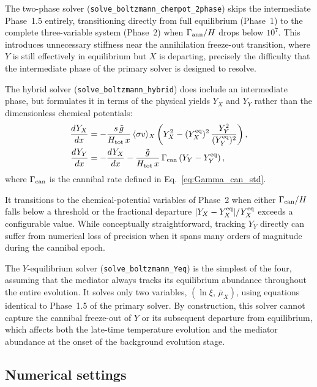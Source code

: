\documentclass[11pt]{article}
\numberwithin{equation}{section}
\newcommand{\sigmav}{\langle\sigma v\rangle}
\begin{document}
The two-phase solver (\texttt{solve\_boltzmann\_chempot\_2phase}) skips the intermediate Phase~1.5 entirely, transitioning directly from full equilibrium (Phase~1) to the complete three-variable system (Phase~2) when $\Gamma_{\rm ann}/H$ drops below $10^7$. This introduces unnecessary stiffness near the annihilation freeze-out transition, where $Y$ is still effectively in equilibrium but $X$ is departing, precisely the difficulty that the intermediate phase of the primary solver is designed to resolve.

The hybrid solver (\texttt{solve\_boltzmann\_hybrid}) does include an intermediate phase, but formulates it in terms of the physical yields $Y_X$ and $Y_Y$ rather than the dimensionless chemical potentials:
\begin{align}
\frac{dY_X}{dx} &= -\frac{s\,\tilde g}{H_{\rm tot}\,x}\,\sigmav_X\left(Y_X^2 - (Y_X^{\rm eq})^2\,\frac{Y_Y^2}{(Y_Y^{\rm eq})^2}\right), \label{eq:dYX_hybrid} \\
\frac{dY_Y}{dx} &= -\frac{dY_X}{dx} - \frac{\tilde g}{H_{\rm tot}\,x}\,\Gamma_{\rm can}\,(Y_Y - Y_Y^{\rm eq})\,,
\label{eq:dYY_hybrid}
\end{align}
where $\Gamma_{\rm can}$ is the cannibal rate defined in Eq.~\eqref{eq:Gamma_can_std}.

It transitions to the chemical-potential variables of Phase~2 when either $\Gamma_{\rm can}/H$ falls below a threshold or the fractional departure $|Y_X - Y_X^{\rm eq}|/Y_X^{\rm eq}$ exceeds a configurable value. While conceptually straightforward, tracking $Y_Y$ directly can suffer from numerical loss of precision when it spans many orders of magnitude during the cannibal epoch.

The $Y$-equilibrium solver (\texttt{solve\_boltzmann\_Yeq}) is the simplest of the four, assuming that the mediator always tracks its equilibrium abundance throughout the entire evolution. It solves only two variables, $(\ln\xi,\,\bar\mu_X)$, using equations identical to Phase~1.5 of the primary solver. By construction, this solver cannot capture the cannibal freeze-out of $Y$ or its subsequent departure from equilibrium, which affects both the late-time temperature evolution and the mediator abundance at the onset of the background evolution stage.

\subsection{Numerical settings}
\label{app:num_details}
\end{document}
